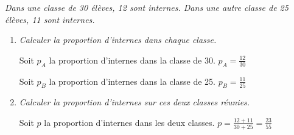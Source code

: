  
\textit{Dans une classe de 30 élèves, 12 sont internes. Dans une autre classe de 25 élèves, 11 sont internes.
}

\begin{enumerate}

\item \textit{Calculer la proportion d'internes dans chaque classe.}


Soit $p_A$ la proportion d'internes dans la classe de 30. $p_A = \frac{12}{30}$ 

Soit $p_B$ la proportion d'internes dans la classe de 25. $p_B = \frac{11}{25}$ 

\item \textit{Calculer la proportion d'internes sur ces deux classes réunies.}

Soit $p$ la proportion d'internes dans les deux classes. $p  = \frac{12+11}{30+25}= \frac{23}{55}$ 


\end{enumerate}


